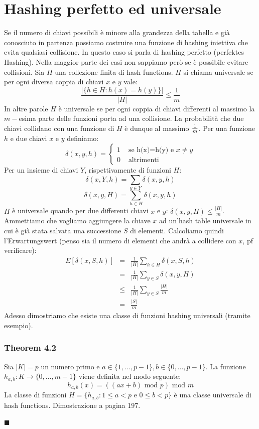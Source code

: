 \documentclass[a4paper]{book}
\newenvironment{mytheorem}[1]{\subsubsection*{Theorem #1}}{\begin{flushright}$\blacksquare$\end{flushright}}
\begin{document}
\section{Hashing perfetto ed universale}
Se il numero di chiavi possibili è minore alla grandezza della tabella e già conosciuto in partenza possiamo costruire una funzione di hashing iniettiva che evita qualsiasi collisione. In questo caso si parla di hashing perfetto (perfektes Hashing).
Nella maggior parte dei casi non sappiamo però se è possibile evitare collisioni. Sia $H$ una collezione finita di hash functions. $H$ si chiama universale se per ogni diversa coppia di chiavi $x$ e $y$ vale:
$$ \frac{\left|\{h\in H: h(x)=h(y)\}\right|}{|H|} \leq \frac{1}{m}$$
In altre parole $H$ è universale se per ogni coppia di chiavi differenti al massimo la $m-$esima parte delle funzioni porta ad una collisione. La probabilità che due chiavi collidano con una funzione di $H$ è dunque al massimo $1\over m$. Per una funzione $h$ e due chiavi $x$ e $y$ definiamo:
$$
\delta (x,y,h) =
\left\{
\begin{array}{rl}
1 & \mbox{ se h(x)=h(y) e } x\neq y  \\
0 & \mbox{ altrimenti}
\end{array}
\right.
$$
Per un insieme di chiavi $Y$, rispettivamente di funzioni $H$:
$$\delta (x,Y,h)= \sum_{y \in Y} \delta (x,y,h)$$
$$\delta (x,y,H)= \sum_{h \in H} \delta (x,y,h)$$
$H$ è universale quando per due differenti chiavi $x$ e $y$: $\delta (x,y,H) \leq \frac{|H|}{m}$.
Ammettiamo che vogliamo aggiungere la chiave $x$ ad un'hash table universale in cui è già stata salvata una successione $S$ di elementi. Calcoliamo quindi l'Erwartungswert (penso sia il numero di elementi che andrà a collidere con $x$, pf verificare):
\begin{eqnarray}
E[\delta (x,S,h)] &=& \frac{1}{|H|} \sum_{h \in H} \delta (x,S,h) \nonumber \\
&=& \frac{1}{|H|} \sum_{y \in S} \delta (x,y,H) \nonumber \\
&\leq & \frac{1}{|H|} \sum_{y \in S} \frac{|H|}{m} \nonumber \\
&=& \frac{|S|}{m}
\end{eqnarray}
Adesso dimostriamo che esiste una classe di funzioni hashing universali (tramite esempio).
\begin{mytheorem}{4.2}
Sia $|K|=p$ un numero primo e $a \in \{1, ..., p-1\},b \in \{0, ..., p-1\}$. La funzione $h_{a,b}: K \rightarrow \{0, ..., m-1\}$ viene definita nel modo seguente:
$$ h_{a,b}(x)=((ax+b) \mbox{ mod } p) \mbox{ mod } m$$
La classe di funzioni $H=\{h_{a,b} : 1\leq a < p \mbox{ e } 0\leq b <p\}$ è una classe universale di hash functions. Dimostrazione a pagina 197.
\end{mytheorem}
\end{document}
